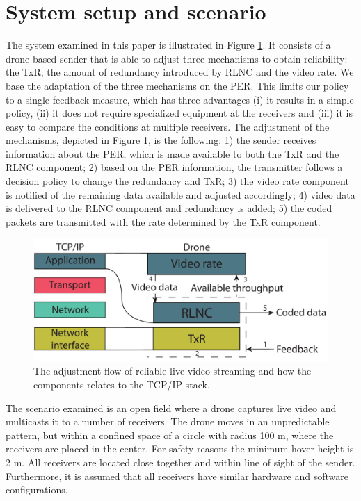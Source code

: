 
\section{System setup and scenario}\label{sec:methodmaterials}

The system examined in this paper is illustrated in Figure \ref{fig:usecase}. It consists of a drone-based sender that is able to adjust three mechanisms to obtain reliability: the TxR, the amount of redundancy introduced by RLNC and the video rate. We base the adaptation of the three mechanisms on the PER. This limits our policy to a single feedback measure, which has three advantages (i) it results in a simple policy, (ii) it does not require specialized equipment at the receivers and (iii) it is easy to compare the conditions at multiple receivers. The adjustment of the mechanisms, depicted in Figure \ref{fig:usecase}, is the following: 1) the sender receives information about the PER, which is made available to both the TxR and the RLNC component; 2) based on the PER information, the transmitter follows a decision policy to change the redundancy and TxR; 3) the video rate component is notified of the remaining data available and adjusted accordingly; 4) video data is delivered to the RLNC component and redundancy is added; 5) the coded packets are transmitted with the rate determined by the TxR component.
\begin{figure}[ht]
  \centering
  \includegraphics[scale=0.5]{images/TCP-Drone.pdf}
  \caption{The adjustment flow of reliable live video streaming and how the components relates to the TCP/IP stack.}
  \label{fig:usecase}
\end{figure}

The scenario examined is an open field where a drone captures live video and multicasts it to a number of receivers. The drone moves in an unpredictable pattern, but within a confined space of a circle with radius 100 m, where the receivers are placed in the center. For safety reasons the minimum hover height is 2 m. All receivers are located close together and within line of sight of the sender. Furthermore, it is assumed that all receivers have similar hardware and software configurations.



